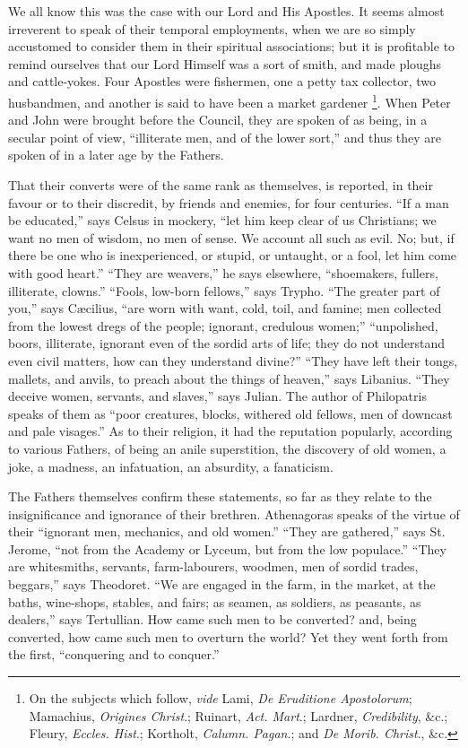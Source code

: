 We all know this was the case with our Lord and His Apostles. It
seems almost irreverent to speak of their temporal employments, when
we are so simply accustomed to consider them in their spiritual
associations; but it is profitable to remind ourselves that our Lord
Himself was a sort of smith, and made ploughs and cattle-yokes. Four
Apostles were fishermen, one a petty tax collector, two husbandmen,
and another is said to have been a market gardener \footnote{On the subjects
which follow, \emph{vide} Lami, \emph{De Eruditione Apostolorum};
Mamachius, \emph{Origines Christ}.; Ruinart, \emph{Act. Mart}.;
Lardner, \emph{Credibility}, \&c.; Fleury, \emph{Eccles. Hist}.;
Kortholt, \emph{Calumn. Pagan}.; and \emph{De Morib. Christ}., \&c.}. When Peter and John were brought before the Council,
they are spoken of as being, in a secular point of view,
``illiterate men, and of the lower sort,'' and thus they are
spoken of in a later age by the Fathers.

That their converts were of the same rank as themselves, is
reported, in their favour or to their discredit, by friends and
enemies, for four centuries. ``If a man be educated,'' says
Celsus in mockery, ``let him keep clear of us Christians; we want
no men of wisdom, no men of sense. We account all such as evil. No;
but, if there be one who is inexperienced, or stupid, or untaught, or
a fool, let him come with good heart.'' ``They are
weavers,'' he says elsewhere, ``shoemakers, fullers,
illiterate, clowns.'' ``Fools, low-born fellows,'' says
Trypho. ``The greater part of you,'' says Cæcilius, ``are
worn with want, cold, toil, and famine; men collected from the lowest
dregs of the people; ignorant, credulous women;''
``unpolished, boors, illiterate, ignorant even of the sordid arts
of life; they do not understand even civil matters, how can they
understand divine?'' ``They have left their tongs, mallets,
and anvils, to preach about the things of heaven,'' says Libanius.
``They deceive women, servants, and slaves,'' says Julian. The
author of Philopatris speaks of them as ``poor creatures, blocks,
withered old fellows, men of downcast and pale visages.'' As to
their religion, it had the reputation popularly, according to various
Fathers, of being an anile superstition, the discovery of old women, a
joke, a madness, an infatuation, an absurdity, a fanaticism.

The Fathers themselves confirm these statements, so far as
they relate to the insignificance and ignorance of their brethren.
Athenagoras speaks of the virtue of their ``ignorant men,
mechanics, and old women.'' ``They are gathered,'' says
St. Jerome, ``not from the Academy or Lyceum, but from the low
populace.'' ``They are whitesmiths, servants, farm-labourers,
woodmen, men of sordid trades, beggars,'' says Theodoret. ``We
are engaged in the farm, in the market, at the baths, wine-shops,
stables, and fairs; as seamen, as soldiers, as peasants, as
dealers,'' says Tertullian. How came such men to be converted?
and, being converted, how came such men to overturn the world? Yet
they went forth from the first, ``conquering and to conquer.''

